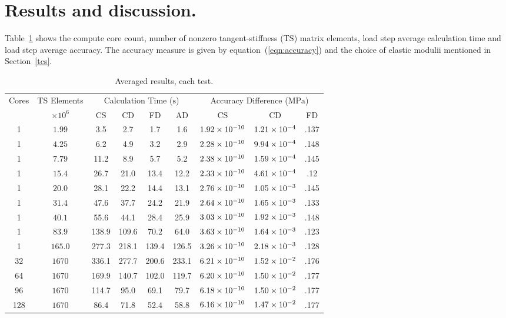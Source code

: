 \documentclass[preprint,12pt]{elsarticle}
\begin{document}
\section{Results and discussion.}
\label{sec:Res}
%
Table~\ref{tab:results} shows the compute core count, number of nonzero tangent-stiffness (TS) matrix elements, load step average calculation time and load step average accuracy. The accuracy measure is given by equation~(\ref{eqn:accuracy}) and the choice of elastic modulii mentioned in Section~\ref{tcs}.
%
\begin{table}[!tbp]    
  \scriptsize
  \centering
  \caption{Averaged results, each test.} \label{tab:results}   
       \begin{tabular}{c c c c c c c c c}
         \toprule
         Cores & TS Elements & \multicolumn{4}{c}{Calculation Time ($\si{\second}$)} & \multicolumn{3}{c}{Accuracy Difference ($\si{\mega\pascal}$)} \\ 
         & $\times 10^6$ & CS & CD & FD & AD & CS & CD & FD \\
        \midrule
        1 & $\num{1.99}$  & 3.5 & 2.7 & 1.7 & 1.6 & $\num{1.92E-10}$ & $\num{1.21E-4}$ & .137 \\
        1 & $\num{4.25}$  & 6.2& 4.9& 3.2& 2.9 & $\num{2.28E-10}$ & $\num{9.94E-4}$ & .148 \\
        1 & $\num{7.79}$  & 11.2& 8.9& 5.7& 5.2 & $\num{2.38E-10}$ & $\num{1.59E-4}$ & .145\\
        1 & $\num{15.4}$  & 26.7& 21.0& 13.4& 12.2 & $\num{2.33E-10}$ & $\num{4.61E-4}$ & .12 \\
        1 & $\num{20.0}$  & 28.1& 22.2& 14.4& 13.1 & $\num{2.76E-10}$ & $\num{1.05E-3}$ & .145 \\
        1 & $\num{31.4}$  & 47.6& 37.7& 24.2& 21.9 & $\num{2.64E-10}$ & $\num{1.65E-3}$ & .133 \\
        1 & $\num{40.1}$  & 55.6& 44.1& 28.4& 25.9 & $\num{3.03E-10}$ & $\num{1.92E-3}$ & .148 \\
        1 & $\num{83.9}$  & 138.9& 109.6& 70.2& 64.0 & $\num{3.63E-10}$ & $\num{1.64E-3}$ & .123 \\
        1 & $\num{165.0}$  & 277.3& 218.1& 139.4& 126.5 & $\num{3.26E-10}$ & $\num{2.18E-3}$ & .128 \\
        32 & $\num{1670}$  & 336.1& 277.7& 200.6& 233.1 & $\num{6.21E-10}$ & $\num{1.52E-2}$ & .176 \\
        64 & $\num{1670}$  & 169.9& 140.7& 102.0& 119.7 & $\num{6.20E-10}$ & $\num{1.50E-2}$ & .177 \\
        96 & $\num{1670}$  & 114.7& 95.0& 69.1 & 79.7 & $\num{6.18E-10}$ & $\num{1.50E-2}$ & .177 \\
        128 & $\num{1670}$  & 86.4& 71.8& 52.4 &58.8 & $\num{6.16E-10}$ & $\num{1.47E-2}$ & .177 \\
        \bottomrule
    \end{tabular}
\end{table}
\end{document}
